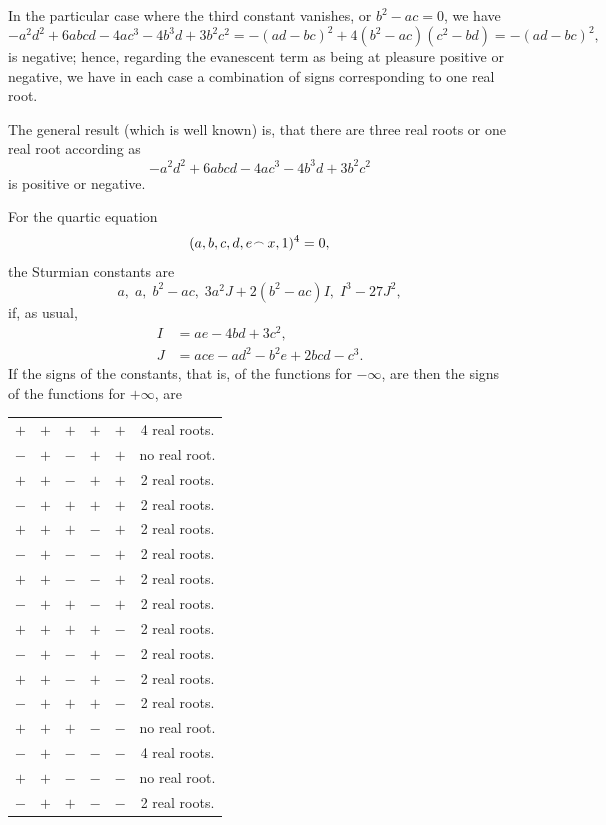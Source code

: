\documentclass[11pt,a4paper]{article}
\theoremstyle{plain}
\begin{document}
In the particular case where the third constant vanishes, or $b^2 - ac = 0$, we have
\[
-a^2d^2 + 6abcd - 4ac^3 - 4b^3d + 3b^2c^2 = -(ad - bc)^2 + 4(b^2 - ac)(c^2 - bd) = -(ad - bc)^2,
\]
is negative; hence, regarding the evanescent term as being at pleasure positive or negative, we have in each case a combination of signs corresponding to one real root.

The general result (which is well known) is, that there are three real roots or one real root according as
\[
-a^2d^2 + 6abcd - 4ac^3 - 4b^3d + 3b^2c^2
\]
is positive or negative.

For the quartic equation
\[
(a, b, c, d, e \mathbin{\vcenter{\hbox{$\scriptstyle\!\frown$}}} x, 1)^4 = 0,
\]
the Sturmian constants are
\[
a,\; a,\; b^2 - ac,\; 3a^2J + 2(b^2 - ac)I,\; I^3 - 27J^2,
\]
if, as usual,
\begin{align*}
I &= ae - 4bd + 3c^2,\\
J &= ace - ad^2 - b^2e + 2bcd - c^3.
\end{align*}
If the signs of the constants, that is, of the functions for $-\infty$, are then the signs of the functions for $+\infty$, are
\begin{center}
\begin{tabular}{ccccc|c}
$+$ & $+$ & $+$ & $+$ & $+$ & 4 real roots.\\
$-$ & $+$ & $-$ & $+$ & $+$ & no real root.\\
$+$ & $+$ & $-$ & $+$ & $+$ & 2 real roots.\\
$-$ & $+$ & $+$ & $+$ & $+$ & 2 real roots.\\
$+$ & $+$ & $+$ & $-$ & $+$ & 2 real roots.\\
$-$ & $+$ & $-$ & $-$ & $+$ & 2 real roots.\\
$+$ & $+$ & $-$ & $-$ & $+$ & 2 real roots.\\
$-$ & $+$ & $+$ & $-$ & $+$ & 2 real roots.\\
$+$ & $+$ & $+$ & $+$ & $-$ & 2 real roots.\\
$-$ & $+$ & $-$ & $+$ & $-$ & 2 real roots.\\
$+$ & $+$ & $-$ & $+$ & $-$ & 2 real roots.\\
$-$ & $+$ & $+$ & $+$ & $-$ & 2 real roots.\\
$+$ & $+$ & $+$ & $-$ & $-$ & no real root.\\
$-$ & $+$ & $-$ & $-$ & $-$ & 4 real roots.\\
$+$ & $+$ & $-$ & $-$ & $-$ & no real root.\\
$-$ & $+$ & $+$ & $-$ & $-$ & 2 real roots.
\end{tabular}
\end{center}
\end{document}
